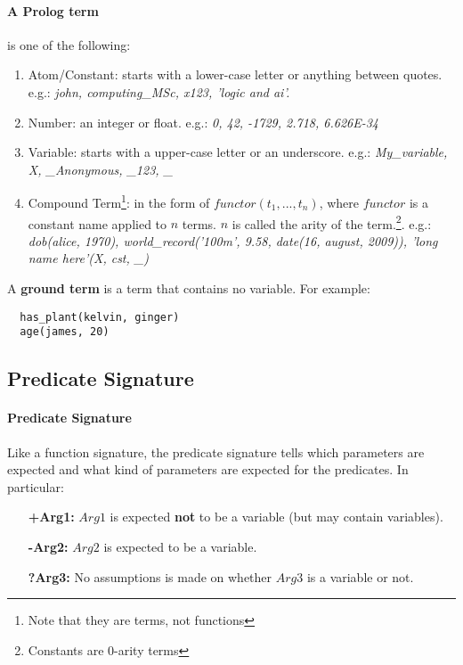 \documentclass{article}
\begin{document}
\begin{multicols}{2}
  \paragraph{A Prolog term} is one of the following:
  
  \begin{enumerate}
  \item Atom/Constant: starts with a lower-case letter or anything between quotes. e.g.: \textit{john, computing\_MSc, x123, 'logic and ai'.}
  \item Number: an integer or float. e.g.: \textit{0, 42, -1729, 2.718, 6.626E-34}
  \item Variable: starts with a upper-case letter or an underscore. e.g.: \textit{My\_variable, X, \_Anonymous, \_123, \_} 
  \item Compound Term\footnote{Note that they are terms, not functions}: in the form of $functor(t_1,..., t_n)$, where $functor$ is a constant name applied to $n$ terms. $n$ is called the arity of the term.\footnote{Constants are 0-arity terms}. e.g.: \textit{dob(alice, 1970), world\_record('100m', 9.58, date(16, august, 2009)), 'long name here'(X, cst, \_)}
  \end{enumerate}
  
  \noindent A {\bf ground term} is a term that contains no variable. For example:
  
  \begin{lstlisting}
  has_plant(kelvin, ginger)
  age(james, 20)
  \end{lstlisting}
  
  \subsection{Predicate Signature}
  
  \paragraph{Predicate Signature} Like a function signature, the predicate signature tells which parameters are expected and what kind of parameters are expected for the predicates. In particular:
  
  \begin{enumerate}
  \item[\bf +Arg1:] $Arg1$ is expected {\bf not} to be a variable (but may contain variables).
  \item[\bf -Arg2:] $Arg2$ is expected to be a variable.
  \item[\bf ?Arg3:] No assumptions is made on whether $Arg3$ is a variable or not.
  \end{enumerate}
  

\end{multicols}
\end{document}
